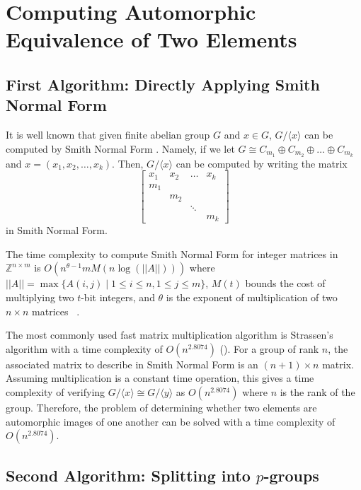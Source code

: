 \documentclass[11pt]{amsart}
\theoremstyle{definition}
\newcommand{\setx}{\langle x \rangle}
\renewcommand{\leq}{\leqslant}
\numberwithin{equation}{section}
\begin{document}
\section{Computing Automorphic Equivalence of Two Elements}\label{sec:computing}
\subsection{First Algorithm: Directly Applying Smith Normal Form}\label{sec:firstalgo}

It is well known that given finite abelian group $G$ and $x \in G$, $G /\setx$ can be computed by Smith Normal Form  \cite{artin}. Namely, if we let $G \cong C_{m_1} \oplus C_{m_2} \oplus \dots \oplus C_{m_k}$ and $x = (x_1, x_2, \dots, x_k)$. Then, $G/\langle x \rangle$ can be computed by writing  the matrix 
\[ \begin{bmatrix}
x_{1} & x_{2} & \dotsc  & x_{k}\\
m_{1} &  &  & \\
 & m_{2} &  & \\
 &  & \ddots  & \\
 &  &  & m_{k}
\end{bmatrix}\] in Smith Normal Form. 

The time complexity to compute Smith Normal Form for integer matrices in $\mathbb{Z}^{n \times m}$ is $O(n^{\theta-1}mM(n\log(||A||)))$ where $||A|| = \max\{A(i,j) \mid 1 \leq i\leq n, 1 \leq j \leq m\}$, $M(t)$ bounds the cost of multiplying 
two $t$-bit integers, and $\theta$ is the exponent of multiplication of two $n \times n$ matrices ~\cite{Storjohann}. 

The most commonly used fast matrix multiplication algorithm is Strassen's algorithm with a time complexity of $O(n^{2.8074})$ (\cite{strassen}). For a group of rank $n$, the associated matrix to describe in Smith Normal Form is an $(n+1) \times n$ matrix. Assuming multiplication is a constant time operation, this gives a time complexity of verifying $G/\langle x \rangle \cong G/\langle y \rangle$ as $O(n^{2.8074})$ where $n$ is the rank of the group. Therefore, the problem of determining whether two elements are automorphic images of one another can be solved with a time complexity of  $O(n^{2.8074})$.

\subsection{Second Algorithm: Splitting into $p$-groups}\label{sec:secondalgo}
\end{document}
